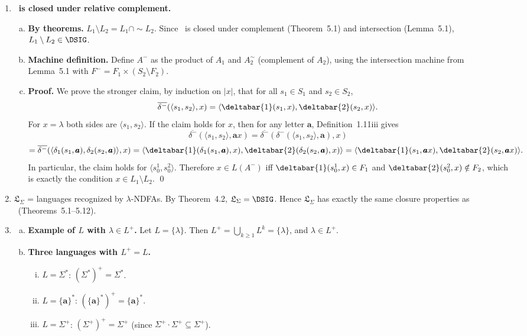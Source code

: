 \begin{enumerate}[{5.}1. ]
\item \textbf{\DSIG\ is closed under relative complement.}

\begin{enumerate}[(a)]
  \item \textbf{By theorems.}  $L_1\setminus L_2=L_1\cap\sim L_2$.  Since \DSIG\ is closed under complement (Theorem~5.1) and intersection (Lemma~5.1), $L_1\setminus L_2\in\DSIG$.

  \item \textbf{Machine definition.}  Define $A^-$ as the product of $A_1$ and $A_2^\sim$ (complement of $A_2$), using the intersection machine from Lemma~5.1 with $F^-=F_1\times(S_2\setminus F_2)$.

  \item \textbf{Proof.}  We prove the stronger claim, by induction on $|x|$,
  that for all $s_1\in S_1$ and $s_2\in S_2$,
  \[
  \overline{\delta^-}(\langle s_1,s_2\rangle,x)
  =\langle\deltabar{1}(s_1,x),\deltabar{2}(s_2,x)\rangle.
  \]
  For $x=\lambda$ both sides are $\langle s_1,s_2\rangle$. If the claim holds
  for $x$, then for any letter $\pmb{a}$, Definition~1.11iii gives
  \[
  \overline{\delta^-}(\langle s_1,s_2\rangle,\pmb{a}x)
  =\overline{\delta^-}(\delta^-(\langle s_1,s_2\rangle,\pmb{a}),x)
  \]
  \[
  =\overline{\delta^-}(\langle\delta_1(s_1,\pmb{a}),\delta_2(s_2,\pmb{a})\rangle,x)
  =\langle\deltabar{1}(\delta_1(s_1,\pmb{a}),x),\deltabar{2}(\delta_2(s_2,\pmb{a}),x)\rangle
  =\langle\deltabar{1}(s_1,\pmb{a}x),\deltabar{2}(s_2,\pmb{a}x)\rangle.
  \]
  In particular, the claim holds for $\langle s^1_0,s^2_0\rangle$.
  Therefore $x\in L(A^-)$ iff $\deltabar{1}(s^1_0,x)\in F_1$ and
  $\deltabar{2}(s^2_0,x)\notin F_2$, which is exactly the condition
  $x\in L_1\setminus L_2$. \qed
\end{enumerate}

\item $\mathfrak{L}_\Sigma$ = languages recognized by $\lambda$-NDFAs.  By Theorem~4.2, $\mathfrak{L}_\Sigma=\DSIG$.  Hence $\mathfrak{L}_\Sigma$ has exactly the same closure properties as \DSIG\ (Theorems~5.1--5.12).

\item \begin{enumerate}[(a)]
  \item \textbf{Example of $L$ with $\lambda\in L^+$.}  Let $L=\{\lambda\}$.  Then $L^+=\bigcup_{k\ge 1}L^k=\{\lambda\}$, and $\lambda\in L^+$.

  \item \textbf{Three languages with $L^+=L$.}
  \begin{enumerate}[(i)]
    \item $L=\Sigma^*$: $(\Sigma^*)^+=\Sigma^*$.
    \item $L=\{\pmb{a}\}^*$: $(\{\pmb{a}\}^*)^+=\{\pmb{a}\}^*$.
    \item $L=\Sigma^+$: $(\Sigma^+)^+=\Sigma^+$ (since $\Sigma^+\cdot\Sigma^+\subseteq\Sigma^+$).
  \end{enumerate}
\end{enumerate}


\end{enumerate}
